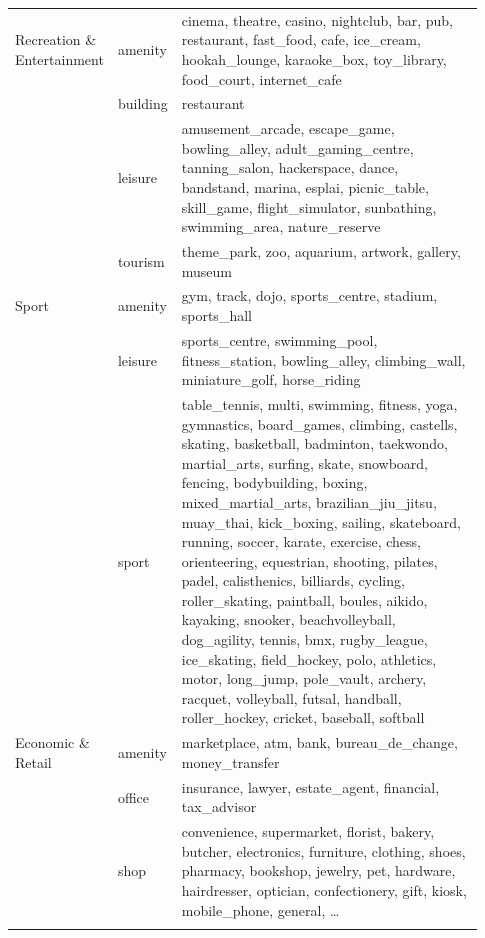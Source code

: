 \begin{scriptsize}
\begin{longtable}{p{0.18\linewidth} p{0.10\linewidth} p{0.65\linewidth}}
    Recreation \& Entertainment
      & amenity  & cinema, theatre, casino, nightclub, bar, pub, restaurant, fast\_food, cafe, ice\_cream, hookah\_lounge, karaoke\_box, toy\_library, food\_court, internet\_cafe \\
      & building & restaurant \\
      & leisure  & amusement\_arcade, escape\_game, bowling\_alley, adult\_gaming\_centre, tanning\_salon, hackerspace, dance, bandstand, marina, esplai, picnic\_table, skill\_game, flight\_simulator, sunbathing, swimming\_area, nature\_reserve \\
      & tourism  & theme\_park, zoo, aquarium, artwork, gallery, museum \\
    \addlinespace

    Sport
      & amenity & gym, track, dojo, sports\_centre, stadium, sports\_hall \\
      & leisure & sports\_centre, swimming\_pool, fitness\_station, bowling\_alley, climbing\_wall, miniature\_golf, horse\_riding \\
      & sport   & table\_tennis, multi, swimming, fitness, yoga, gymnastics, board\_games, climbing, castells, skating, basketball, badminton, taekwondo, martial\_arts, surfing, skate, snowboard, fencing, bodybuilding, boxing, mixed\_martial\_arts, brazilian\_jiu\_jitsu, muay\_thai, kick\_boxing, sailing, skateboard, running, soccer, karate, exercise, chess, orienteering, equestrian, shooting, pilates, padel, calisthenics, billiards, cycling, roller\_skating, paintball, boules, aikido, kayaking, snooker, beachvolleyball, dog\_agility, tennis, bmx, rugby\_league, ice\_skating, field\_hockey, polo, athletics, motor, long\_jump, pole\_vault, archery, racquet, volleyball, futsal, handball, roller\_hockey, cricket, baseball, softball \\
    \addlinespace

    Economic \& Retail
      & amenity & marketplace, atm, bank, bureau\_de\_change, money\_transfer \\
      & office  & insurance, lawyer, estate\_agent, financial, tax\_advisor \\
      & shop    & convenience, supermarket, florist, bakery, butcher, electronics, furniture, clothing, shoes, pharmacy, bookshop, jewelry, pet, hardware, hairdresser, optician, confectionery, gift, kiosk, mobile\_phone, general, \dots \\
    \addlinespace


\end{longtable}
\end{scriptsize}
